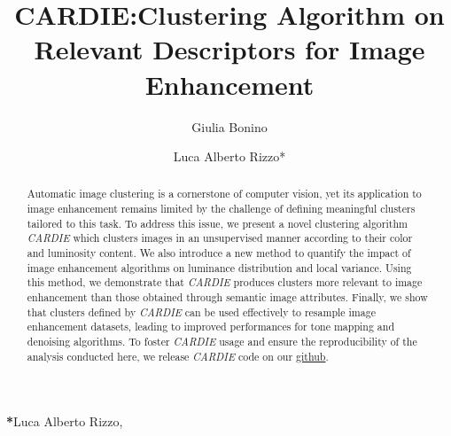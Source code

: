 \documentclass[12pt]{spieman}  %
\title{CARDIE:Clustering Algorithm on Relevant Descriptors for Image Enhancement}
\author[a,b]{Giulia Bonino}
\author[b]{Luca Alberto Rizzo*}
\affil[a]{Eurecom, Huawei Nice Reseach Center}
\affil[b]{Huawei Nice Research Center}
\begin{document}
 
\maketitle
\newcommand{\clustname}{\textit{CARDIE} } %
\newcommand{\silscore}{$\mathrm{SC}^{'}$ } %


\begin{abstract}
{Automatic image clustering is a cornerstone of computer vision, yet its application to image enhancement remains limited by the challenge of defining meaningful clusters tailored to this task. To address this issue, we present a novel clustering algorithm} \clustname {which clusters images in an unsupervised manner according to their color and luminosity content. We also introduce a new method to quantify the impact of image enhancement algorithms on luminance distribution and local variance.  Using this method, we demonstrate that} \clustname{produces clusters more relevant to image enhancement than those obtained through semantic image attributes. Finally, we show that clusters defined by} \clustname {can be  used effectively to resample image enhancement datasets, leading to improved performances for tone mapping and denoising algorithms.  To foster} \clustname {usage and ensure the reproducibility of the analysis conducted here, we release} \clustname {code on our} \href{https://github.com/GiuliaBonino/CARDIE}{ github}.
\end{abstract}



{\noindent \footnotesize\textbf{*}Luca Alberto Rizzo,   }
\end{document}

